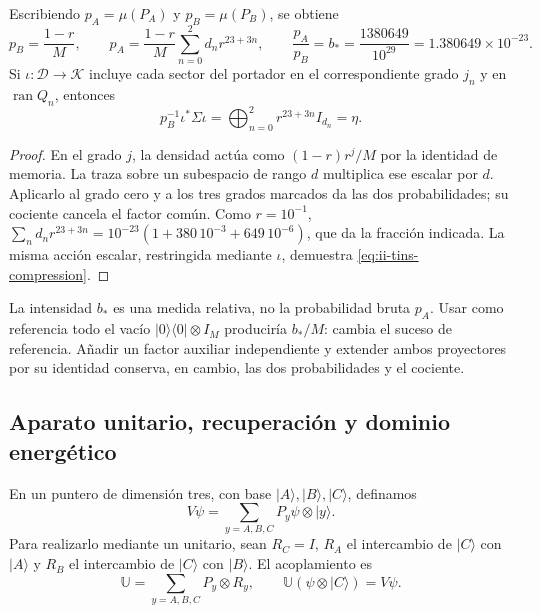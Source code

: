 \begin{samepage}
\begin{proposition}
\label{prop:ii-tins-relative}
Escribiendo $p_A=\mu(P_A)$ y $p_B=\mu(P_B)$, se obtiene
\begin{equation}
 p_B=\frac{1-r}{M},\qquad
 p_A=\frac{1-r}{M}\sum_{n=0}^2d_nr^{23+3n},\qquad
 \frac{p_A}{p_B}=b_*=
 \frac{1380649}{10^{29}}=1.380649\times10^{-23}.
 \label{eq:ii-tins-relative}
\end{equation}
Si $\iota:\mathcal D\to\mathcal K$ incluye cada sector del portador
en el correspondiente grado $j_n$ y en $\operatorname{ran}Q_n$, entonces
\begin{equation}
 p_B^{-1}\iota^*\Sigma\iota
 =\bigoplus_{n=0}^2r^{23+3n}I_{d_n}=\eta.
 \label{eq:ii-tins-compression}
\end{equation}
\end{proposition}
\end{samepage}
\begin{proof}
En el grado $j$, la densidad actúa como $(1-r)r^j/M$ por la identidad
de memoria. La traza sobre un subespacio de rango $d$ multiplica ese
escalar por $d$. Aplicarlo al grado cero y a los tres grados marcados
da las dos probabilidades; su cociente cancela el factor común.
Como $r=10^{-1}$,
$\sum_nd_nr^{23+3n}=10^{-23}(1+380\,10^{-3}+649\,10^{-6})$,
que da la fracción indicada. La misma acción escalar, restringida mediante
$\iota$, demuestra \eqref{eq:ii-tins-compression}.
\end{proof}

La intensidad $b_*$ es una medida relativa, no la probabilidad bruta $p_A$.
Usar como referencia todo el vacío $|0\rangle\langle0|\otimes I_M$
produciría $b_*/M$: cambia el suceso de referencia. Añadir un factor auxiliar
independiente y extender ambos proyectores por su identidad conserva, en
cambio, las dos probabilidades y el cociente.

\subsection{Aparato unitario, recuperación y dominio energético}
\label{subsec:ii-tins-aparato}

En un puntero de dimensión tres, con base $|A\rangle,|B\rangle,|C\rangle$,
definamos
\begin{equation}
 V\psi=\sum_{y=A,B,C}P_y\psi\otimes|y\rangle.
 \label{eq:ii-tins-isometry}
\end{equation}
Para realizarlo mediante un unitario, sean $R_C=I$, $R_A$ el intercambio
de $|C\rangle$ con $|A\rangle$ y $R_B$ el intercambio de $|C\rangle$
con $|B\rangle$. El acoplamiento es
\begin{equation}
 \mathbb U=\sum_{y=A,B,C}P_y\otimes R_y,
 \qquad \mathbb U(\psi\otimes|C\rangle)=V\psi.
 \label{eq:ii-tins-unitary}
\end{equation}

